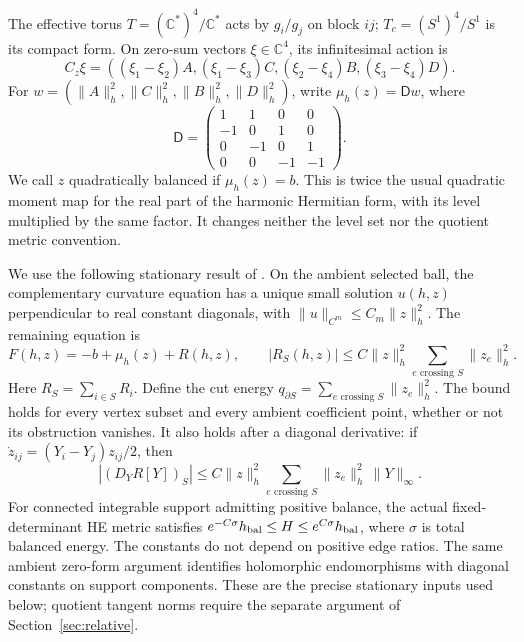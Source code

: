 \documentclass[11pt]{amsart}
\theoremstyle{definition}
\theoremstyle{remark}
\newcommand{\CC}{\mathbb C}
\begin{document}
The effective torus $T=(\CC^*)^4/\CC^*$ acts by $g_i/g_j$ on
block $ij$; $T_c=(S^1)^4/S^1$ is its compact form. On zero-sum
vectors $\xi\in\CC^4$, its infinitesimal action is
\begin{equation}\label{eq:selected-orbit}
 C_z\xi=((\xi_1-\xi_2)A,(\xi_1-\xi_3)C,
             (\xi_2-\xi_4)B,(\xi_3-\xi_4)D).
\end{equation}
For $w=(\|A\|_h^2,\|C\|_h^2,\|B\|_h^2,\|D\|_h^2)$,
write $\mu_h(z)=\mathsf Dw$, where
\begin{equation}\label{eq:incidence}
 \mathsf D=\begin{pmatrix}1&1&0&0\\-1&0&1&0\\
 0&-1&0&1\\0&0&-1&-1\end{pmatrix}.
\end{equation}
We call $z$ quadratically balanced if $\mu_h(z)=b$.
This is twice the usual quadratic moment map for the real part of the
harmonic Hermitian form, with its level multiplied by the same factor.
It changes neither the level set nor the quotient metric convention.

We use the following stationary result of \cite{wuebben2026three}.
On the ambient selected ball, the complementary curvature equation has a
unique small solution $u(h,z)$ perpendicular to real constant diagonals,
with $\|u\|_{C^m}\le C_m\|z\|_h^2$. The remaining equation is
\begin{equation}\label{eq:stationary-cut}
 F(h,z)=-b+\mu_h(z)+R(h,z),\qquad
 |R_S(h,z)|\le C\|z\|_h^2
          \sum_{e\text{ crossing }S}\|z_e\|_h^2.
\end{equation}
Here $R_S=\sum_{i\in S}R_i$. Define the cut energy
$q_{\partial S}=\sum_{e\text{ crossing }S}\|z_e\|_h^2$.
The bound holds for every vertex subset and every ambient coefficient
point, whether or not its obstruction vanishes. It also holds after a diagonal derivative:
if $\dot z_{ij}=(Y_i-Y_j)z_{ij}/2$, then
\begin{equation}\label{eq:stationary-cut-derivative}
 |(D_YR[Y])_S|\le C\|z\|_h^2
       \sum_{e\text{ crossing }S}\|z_e\|_h^2\,\|Y\|_\infty.
\end{equation}
For connected integrable support admitting positive balance, the actual
fixed-determinant HE metric satisfies
$e^{-C\sigma}h_{\rm bal}\le H\le e^{C\sigma}h_{\rm bal}$,
where $\sigma$ is total balanced energy. The constants do not depend on
positive edge ratios. The same ambient zero-form argument identifies
holomorphic endomorphisms with diagonal constants on support components.
These are the precise stationary inputs used below; quotient tangent norms
require the separate argument of Section~\ref{sec:relative}.
\end{document}
